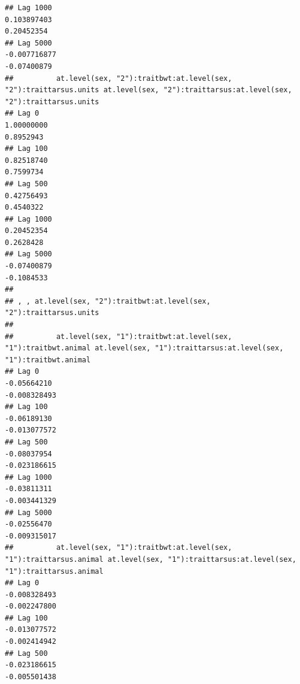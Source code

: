 \documentclass[
  12pt,
]{book}
\begin{document}
\begin{verbatim}
## Lag 1000                                                   0.103897403                                                       0.20452354
## Lag 5000                                                  -0.007716877                                                      -0.07400879
##          at.level(sex, "2"):traitbwt:at.level(sex, "2"):traittarsus.units at.level(sex, "2"):traittarsus:at.level(sex, "2"):traittarsus.units
## Lag 0                                                          1.00000000                                                           0.8952943
## Lag 100                                                        0.82518740                                                           0.7599734
## Lag 500                                                        0.42756493                                                           0.4540322
## Lag 1000                                                       0.20452354                                                           0.2628428
## Lag 5000                                                      -0.07400879                                                          -0.1084533
## 
## , , at.level(sex, "2"):traitbwt:at.level(sex, "2"):traittarsus.units
## 
##          at.level(sex, "1"):traitbwt:at.level(sex, "1"):traitbwt.animal at.level(sex, "1"):traittarsus:at.level(sex, "1"):traitbwt.animal
## Lag 0                                                       -0.05664210                                                      -0.008328493
## Lag 100                                                     -0.06189130                                                      -0.013077572
## Lag 500                                                     -0.08037954                                                      -0.023186615
## Lag 1000                                                    -0.03811311                                                      -0.003441329
## Lag 5000                                                    -0.02556470                                                      -0.009315017
##          at.level(sex, "1"):traitbwt:at.level(sex, "1"):traittarsus.animal at.level(sex, "1"):traittarsus:at.level(sex, "1"):traittarsus.animal
## Lag 0                                                         -0.008328493                                                         -0.002247800
## Lag 100                                                       -0.013077572                                                         -0.002414942
## Lag 500                                                       -0.023186615                                                         -0.005501438

\end{verbatim}
\end{document}
